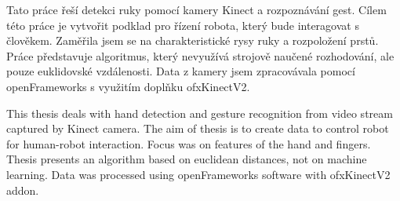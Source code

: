 \startAbstractCz



Tato práce řeší detekci ruky pomocí kamery Kinect a rozpoznávání gest. Cílem této práce je vytvořit podklad pro řízení robota, který bude interagovat s člověkem. Zaměřila jsem se na charakteristické rysy ruky a rozpoložení prstů.
Práce představuje algoritmus, který nevyužívá strojově naučené rozhodování, ale pouze euklidovské vzdálenosti. Data z kamery jsem zpracovávala pomocí openFrameworks s využitím doplňku ofxKinectV2.



\stopAbstractCz

\startAbstractEn
This thesis deals with hand detection and gesture recognition from video stream captured by Kinect camera. The aim of thesis is to create data to control robot for human-robot interaction. Focus was on features of the hand and fingers. Thesis presents an algorithm based on euclidean distances, not on machine learning. Data was processed using openFrameworks software with ofxKinectV2 addon.
\stopAbstractEn

\endinput
